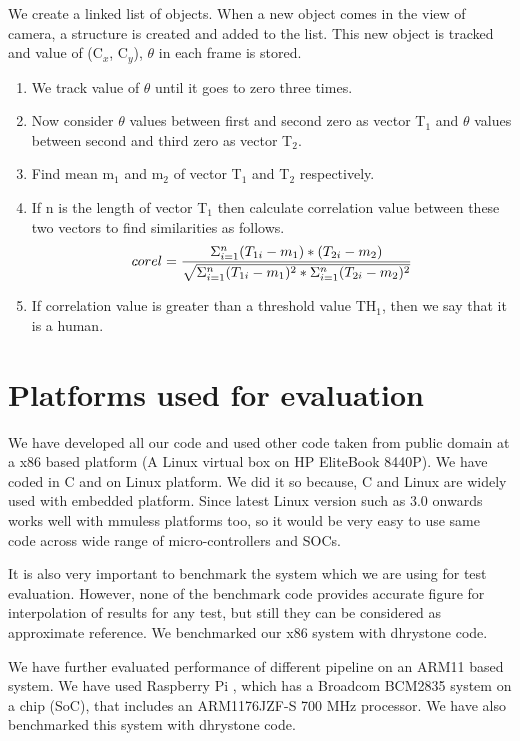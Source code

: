 \begin{enumerate}
\indent We create a linked list of objects. When a new object comes in
the view of camera, a structure is created and added to the list. This
new object is tracked and value of (C$_x$, C$_y$), $\theta$ in each
frame is stored.
\begin{enumerate} 
\item We track value of $\theta$ until it goes to zero three times.
\item Now consider $\theta$ values between first and second zero as
vector T$_1$ and $\theta$ values between second and third zero as vector
T$_2$.
\item Find mean m$_1$ and m$_2$ of vector T$_1$ and T$_2$ respectively.
\item If n is the length of vector T$_1$ then calculate correlation value
between these two vectors to find similarities as follows.
	\begin{equation}
	corel = {{\Sigma ^n _{i = 1}(T_{1i} - m_1) * (T_{2i} - m_2)}
\over {\sqrt {\Sigma ^n _{i = 1} (T_{1i} - m_1)^2 * \Sigma ^n _{i = 1} (T_{2i}
- m_2)^2}}}
	\end{equation}
\item If correlation value is greater than a threshold value TH$_1$, then we say
that it is a human.
\end{enumerate} 

\end{enumerate} 

\pagebreak

\section {Platforms used for evaluation}

\indent We have developed all our code and used other code taken from
public domain at a x86 based platform (A Linux virtual box on HP
EliteBook 8440P). We have coded in C and on Linux platform. We did it so
because, C and Linux are widely used with embedded platform. Since
latest Linux version such as 3.0 onwards works well with mmuless
platforms too, so it would be very easy to use same code across wide
range of micro-controllers and SOCs.

\indent It is also very important to benchmark the system which we are
using for test evaluation. However, none of the benchmark code provides
accurate figure for interpolation of results for any test, but still
they can be considered as approximate reference. We benchmarked our x86
system with dhrystone code.

\indent We have further evaluated performance of different pipeline on
an ARM11 based system. We have used Raspberry Pi , which has a Broadcom
BCM2835 system on a chip (SoC), that includes an ARM1176JZF-S 700 MHz
processor. We have also benchmarked this system with dhrystone code.
